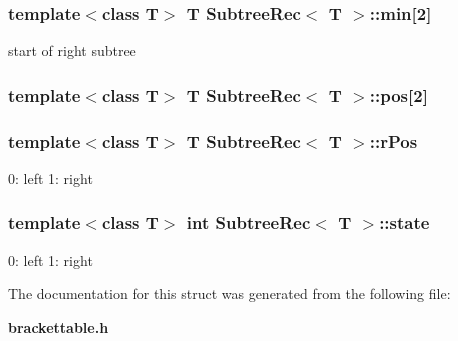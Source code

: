 \subsubsection{\setlength{\rightskip}{0pt plus 5cm}template$<$class T$>$ T {\bf Subtree\-Rec}$<$ T $>$::{\bf min}[2]}\label{structSubtreeRec_o2}


start of right subtree 

\subsubsection{\setlength{\rightskip}{0pt plus 5cm}template$<$class T$>$ T {\bf Subtree\-Rec}$<$ T $>$::{\bf pos}[2]}\label{structSubtreeRec_o0}


\subsubsection{\setlength{\rightskip}{0pt plus 5cm}template$<$class T$>$ T {\bf Subtree\-Rec}$<$ T $>$::{\bf r\-Pos}}\label{structSubtreeRec_o1}


0: left 1: right 

\subsubsection{\setlength{\rightskip}{0pt plus 5cm}template$<$class T$>$ int {\bf Subtree\-Rec}$<$ T $>$::{\bf state}}\label{structSubtreeRec_o3}


0: left 1: right 



The documentation for this struct was generated from the following file:\begin{CompactItemize}
\item 
{\bf brackettable.h}\end{CompactItemize}
